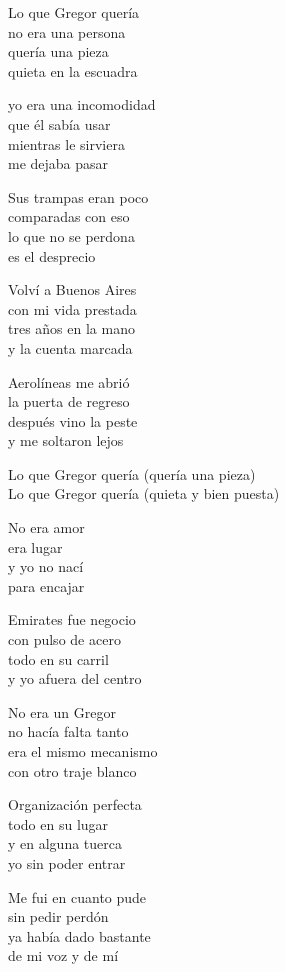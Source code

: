 \begin{lyrics}
Lo que Gregor quería\\
no era una persona\\
quería una pieza\\
quieta en la escuadra

yo era una incomodidad\\
que él sabía usar\\
mientras le sirviera\\
me dejaba pasar

Sus trampas eran poco\\
comparadas con eso\\
lo que no se perdona\\
es el desprecio

Volví a Buenos Aires\\
con mi vida prestada\\
tres años en la mano\\
y la cuenta marcada

Aerolíneas me abrió\\
la puerta de regreso\\
después vino la peste\\
y me soltaron lejos

Lo que Gregor quería
(quería una pieza)\\
Lo que Gregor quería
(quieta y bien puesta)

No era amor\\
era lugar\\
y yo no nací\\
para encajar

Emirates fue negocio\\
con pulso de acero\\
todo en su carril\\
y yo afuera del centro

No era un Gregor\\
no hacía falta tanto\\
era el mismo mecanismo\\
con otro traje blanco

Organización perfecta\\
todo en su lugar\\
y en alguna tuerca\\
yo sin poder entrar

Me fui en cuanto pude\\
sin pedir perdón\\
ya había dado bastante\\
de mi voz y de mí


\end{lyrics}
